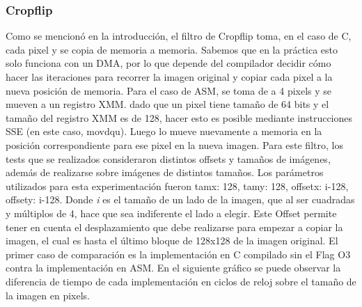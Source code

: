 \documentclass[a4paper]{article}
\begin{document}
\subsubsection{Cropflip}
Como se mencionó en la introducción, el filtro de Cropflip toma, en el caso de C, cada pixel y se copia de memoria a memoria. 
Sabemos que en la práctica esto solo funciona con un DMA, por lo que depende del compilador decidir cómo hacer las iteraciones para 
recorrer la imagen original y copiar cada pixel a la nueva posición de memoria.
Para el caso de ASM, se toma de a 4 pixels y se mueven a un registro XMM. dado que un pixel tiene tamaño de 64 bits y el tamaño
del registro XMM es de 128, hacer esto es posible mediante instrucciones SSE (en este caso, movdqu). Luego lo mueve nuevamente a memoria
en la posición correspondiente para ese pixel en la nueva imagen. 
Para este filtro, los tests que se realizados consideraron distintos offsets y tamaños de imágenes, además de realizarse sobre imágenes de
distintos tamaños. 
\newline
Los parámetros utilizados para esta experimentación fueron tamx: 128, tamy: 128, offsetx: i-128, offsety: i-128. Donde \textit{i} es
el tamaño de un lado de la imagen, que al ser cuadradas y múltiplos de 4, hace que sea indiferente el lado a elegir.
Este Offset permite tener en cuenta el desplazamiento que debe realizarse para empezar a copiar la imagen, el cual es hasta el último
bloque de 128x128 de la imagen original.
\newline
El primer caso de comparación es la implementación en C compilado sin el Flag O3 contra la implementación en ASM. En el siguiente gráfico
se puede observar la diferencia de tiempo de cada implementación en ciclos de reloj sobre el tamaño de la imagen en pixels.

\begin{figure}[!ht]
    \centering
    \begin{floatrow}
    \end{floatrow}
\end{figure}
\end{document}
